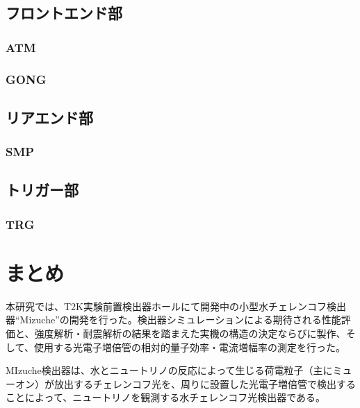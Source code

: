 \documentclass[11pt]{ltjsreport}
\begin{document}
\section{フロントエンド部}
\subsection{ATM}
\subsection{GONG}
\section{リアエンド部}
\subsection{SMP}
\section{トリガー部}
\subsection{TRG}
\fi


\chapter{まとめ}

本研究では、T2K実験前置検出器ホールにて開発中の小型水チェレンコフ検出器``Mizuche''の開発を行った。検出器シミュレーションによる期待される性能評価と、強度解析・耐震解析の結果を踏まえた実機の構造の決定ならびに製作、そして、使用する光電子増倍管の相対的量子効率・電流増幅率の測定を行った。

MIzuche検出器は、水とニュートリノの反応によって生じる荷電粒子（主にミューオン）が放出するチェレンコフ光を、周りに設置した光電子増倍管で検出することによって、ニュートリノを観測する水チェレンコフ光検出器である。
\end{document}
